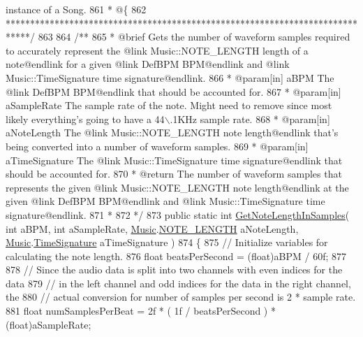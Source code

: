 \begin{DoxyCodeInclude}
{       instance of a Song.}
861 \textcolor{comment}{     * @\{}
862 \textcolor{comment}{    *****************************************************************************/}
863 \textcolor{comment}{}
864 \textcolor{comment}{    /** }
865 \textcolor{comment}{     * @brief Gets the number of waveform samples required to accurately represent the @link
       Music::NOTE\_LENGTH length of a note@endlink for a given @link DefBPM BPM@endlink and @link Music::TimeSignature time
       signature@endlink.}
866 \textcolor{comment}{     * @param[in] aBPM The @link DefBPM BPM@endlink that should be accounted for.}
867 \textcolor{comment}{     * @param[in] aSampleRate The sample rate of the note. Might need to remove since most likely
       everything's going to have a 44\(\backslash\).1KHz sample rate.}
868 \textcolor{comment}{     * @param[in] aNoteLength The @link Music::NOTE\_LENGTH note length@endlink that's being converted into
       a number of waveform samples.}
869 \textcolor{comment}{     * @param[in] aTimeSignature The @link Music::TimeSignature time signature@endlink that should be
       accounted for.}
870 \textcolor{comment}{     * @return The number of waveform samples that represents the given @link Music::NOTE\_LENGTH note
       length@endlink at the given @link DefBPM BPM@endlink and @link Music::TimeSignature time signature@endlink.}
871 \textcolor{comment}{     * }
872 \textcolor{comment}{    */}
873     \textcolor{keyword}{public} \textcolor{keyword}{static} \textcolor{keywordtype}{int} \hyperlink{group___song_stat_func_ga03712f6defbff25d5a1cd964e4bc3211}{GetNoteLengthInSamples}( \textcolor{keywordtype}{int} aBPM, \textcolor{keywordtype}{int} aSampleRate, 
      \hyperlink{class_music}{Music}.\hyperlink{group___music_enums_gaf11b5f079adbb21c800b9eca1c5c3cbd}{NOTE\_LENGTH} aNoteLength, \hyperlink{class_music}{Music}.\hyperlink{group___music_structs_struct_music_1_1_time_signature}{TimeSignature} aTimeSignature )
874     \{
875         \textcolor{comment}{// Initialize variables for calculating the note length.}
876         \textcolor{keywordtype}{float} beatsPerSecond = (float)aBPM / 60f;
877 
878         \textcolor{comment}{// Since the audio data is split into two channels with even indices for the data }
879         \textcolor{comment}{// in the left channel and odd indices for the data in the right channel, the}
880         \textcolor{comment}{// actual conversion for number of samples per second is 2 * sample rate.}
881         \textcolor{keywordtype}{float} numSamplesPerBeat = 2f * ( 1f / beatsPerSecond ) * (\textcolor{keywordtype}{float})aSampleRate;

\end{DoxyCodeInclude}
